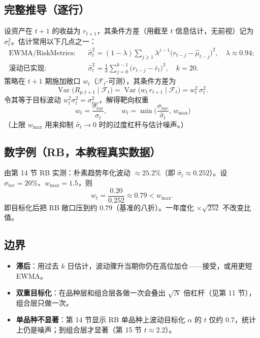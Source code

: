 \documentclass[UTF8,11pt]{ctexart}
\begin{document}
\subsection{完整推导（逐行）}
设资产在 $t+1$ 的收益为 $r_{t+1}$，其条件方差（用截至 $t$ 信息估计，无前视）记为 $\sigma_t^2$。估计常用以下几点之一：
\begin{align}
\text{EWMA/RiskMetrics:}\quad &\hat\sigma_t^2 = (1-\lambda)\sum_{j\ge1}\lambda^{j-1}\big(r_{t-j}-\hat\mu_{t-j}\big)^2,\quad \lambda\approx0.94;\\
\text{滚动已实现:}\quad &\hat\sigma_t^2 = \frac1k\sum_{j=0}^{k-1}\big(r_{t-j}-\bar r_t\big)^2,\quad k=20.
\end{align}
策略在 $t+1$ 期施加敞口 $w_t$（$\mathcal{F}_t$-可测），其条件方差为
\begin{equation}
\operatorname{Var}\big(R_{p,t+1}\mid\mathcal{F}_t\big)
= \operatorname{Var}\big(w_t\,r_{t+1}\mid\mathcal{F}_t\big)
= w_t^2\,\sigma_t^2 .
\end{equation}
令其等于目标波动 $w_t^2\sigma_t^2=\sigma_{tar}^2$，解得靶向权重
\begin{equation}
\boxed{\; w_t = \frac{\sigma_{tar}}{\sigma_t},\qquad
w_t = \min\Big(\frac{\sigma_{tar}}{\hat\sigma_t},\,w_{\max}\Big)}
\end{equation}
（上限 $w_{\max}$ 用来抑制 $\hat\sigma_t\to0$ 时的过度杠杆与估计噪声。）
\subsection{数字例（RB，本教程真实数据）}
由第 14 节 RB 实测：朴素趋势年化波动 $\approx25.2\%$（即 $\hat\sigma_t\approx0.252$）。设 $\sigma_{tar}=20\%$、$w_{\max}=1.5$，则
$$
w_t = \frac{0.20}{0.252} \approx 0.79 < w_{\max}.
$$
即目标化后把 RB 敞口压到约 $0.79$（基准的八折）。一年度化 $\times\sqrt{252}$ 不改变比值。
\subsection{边界}
\begin{itemize}[itemsep=2pt]
\item \textbf{滞后}：用过去 $k$ 日估计，波动骤升当期你仍在高位加仓——接受，或用更短 EWMA。
\item \textbf{双重目标化}：在品种层和组合层各做一次会叠出 $\sqrt N$ 倍杠杆（见第 11 节），组合层只做一次。
\item \textbf{单品种不显著}：第 14 节显示 RB 单品种上波动目标化 $\alpha$ 的 $t$ 仅约 $0.7$，统计上仍是噪声；到组合层才显著（第 15 节 $t\approx2.2$）。
\end{itemize}
\end{document}
